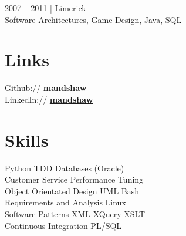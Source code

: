 \documentclass[letterpaper]{deedy-resume} %
\begin{document}
\begin{minipage}[t]{0.33\textwidth}
2007 – 2011 | Limerick\\
Software Architectures, Game Design, Java, SQL\\

\sectionspace %



\section{Links} 

Github:// \href{https://github.com/mandshaw}{\bf mandshaw} \\
LinkedIn:// \href{www.linkedin.com/in/mandshaw}{\bf mandshaw} 

\sectionspace %



\section{Skills}


Python \textbullet{} TDD \textbullet{} Databases (Oracle)  \\
Customer Service \textbullet{} Performance Tuning  \\ 
Object Orientated Design \textbullet{} UML \textbullet{} Bash  \\ 
Requirements and Analysis \textbullet{} Linux  \\
Software Patterns \textbullet{} XML \textbullet{} XQuery\textbullet{} XSLT \\ 
Continuous Integration \textbullet{} PL/SQL 

\sectionspace %



\end{minipage} %
\hfill
%
%
\end{document}

